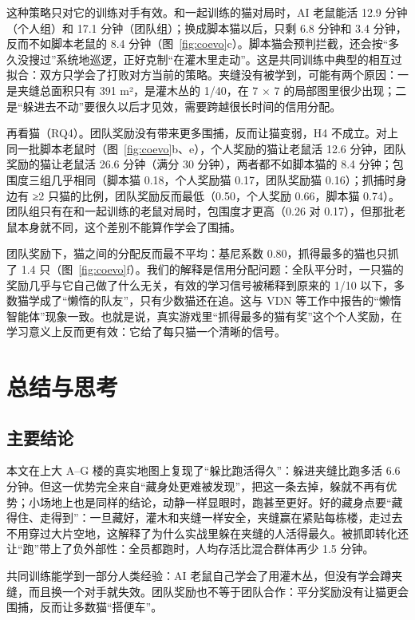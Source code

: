 \documentclass[a4paper,zihao=5,fontset=fandol,UTF8]{ctexart}
\begin{document}
这种策略只对它的训练对手有效。和一起训练的猫对局时，AI 老鼠能活 12.9 分钟（个人组）和 17.1 分钟（团队组）；换成脚本猫以后，只剩 6.8 分钟和 3.4 分钟，反而不如脚本老鼠的 8.4 分钟（图~\ref{fig:coevo}c）。脚本猫会预判拦截，还会按“多久没搜过”系统地巡逻，正好克制“在灌木里走动”。这是共同训练中典型的相互过拟合：双方只学会了打败对方当前的策略。夹缝没有被学到，可能有两个原因：一是夹缝总面积只有 391 m²，是灌木丛的 1/40，在 7 × 7 的局部图里很少出现；二是“躲进去不动”要很久以后才见效，需要跨越很长时间的信用分配。

再看猫（RQ4）。团队奖励没有带来更多围捕，反而让猫变弱，H4 不成立。对上同一批脚本老鼠时（图~\ref{fig:coevo}b、e），个人奖励的猫让老鼠活 12.6 分钟，团队奖励的猫让老鼠活 26.6 分钟（满分 30 分钟），两者都不如脚本猫的 8.4 分钟；包围度三组几乎相同（脚本猫 0.18，个人奖励猫 0.17，团队奖励猫 0.16）；抓捕时身边有 ≥2 只猫的比例，团队奖励反而最低（0.50，个人奖励 0.66，脚本猫 0.74）。团队组只有在和一起训练的老鼠对局时，包围度才更高（0.26 对 0.17），但那批老鼠本身就不同，这个差别不能算作学会了围捕。

团队奖励下，猫之间的分配反而最不平均：基尼系数 0.80，抓得最多的猫也只抓了 1.4 只（图~\ref{fig:coevo}f）。我们的解释是信用分配问题：全队平分时，一只猫的奖励几乎与它自己做了什么无关，有效的学习信号被稀释到原来的 1/10 以下，多数猫学成了“懒惰的队友”，只有少数猫还在追。这与 VDN 等工作中报告的“懒惰智能体”现象一致\cite{sunehag2018}。也就是说，真实游戏里“抓得最多的猫有奖”这个个人奖励，在学习意义上反而更有效：它给了每只猫一个清晰的信号。

\section{总结与思考}
\subsection{主要结论}
本文在上大 A–G 楼的真实地图上复现了“躲比跑活得久”：躲进夹缝比跑多活 6.6 分钟。但这一优势完全来自“藏身处更难被发现”，把这一条去掉，躲就不再有优势；小场地上也是同样的结论，动静一样显眼时，跑甚至更好。好的藏身点要“藏得住、走得到”：一旦藏好，灌木和夹缝一样安全，夹缝赢在紧贴每栋楼，走过去不用穿过大片空地，这解释了为什么实战里躲在夹缝的人活得最久。被抓即转化还让“跑”带上了负外部性：全员都跑时，人均存活比混合群体再少 1.5 分钟。

共同训练能学到一部分人类经验：AI 老鼠自己学会了用灌木丛，但没有学会蹲夹缝，而且换一个对手就失效。团队奖励也不等于团队合作：平分奖励没有让猫更会围捕，反而让多数猫“搭便车”。
\end{document}
